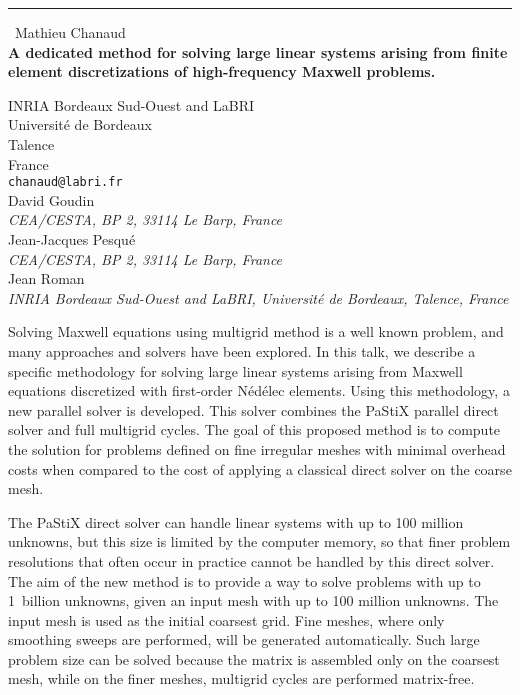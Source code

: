 \documentclass{report}
\begin{document}
\begin{center}
\rule{6in}{1pt} \
{\large Mathieu Chanaud \\
{\bf A dedicated method for solving large linear systems arising from finite element discretizations of high-frequency Maxwell problems. }}

INRIA Bordeaux Sud-Ouest and LaBRI \\ Universit\'e de Bordeaux \\ Talence \\ France
\\
{\tt chanaud@labri.fr}\\
David Goudin\\
{\em CEA/CESTA, BP 2, 33114 Le Barp, France}\\
Jean-Jacques Pesqu\'e\\
{\em CEA/CESTA, BP 2, 33114 Le Barp, France}\\
Jean Roman\\
{\em INRIA Bordeaux Sud-Ouest and LaBRI, Universit\'e de Bordeaux, Talence, France}\end{center}

\newcommand{\nedelec}{N\'ed\'elec}
Solving Maxwell equations using multigrid method is a well known
problem, and many approaches and solvers have been explored. In this
talk, we describe a specific
methodology for solving large linear systems arising from Maxwell
equations discretized with first-order {\nedelec} elements. Using this
methodology, a new parallel solver is developed. This solver combines
the PaStiX parallel direct solver and full multigrid cycles. The goal
of this proposed method is to compute the solution for problems
defined on fine irregular meshes with minimal overhead costs when
compared to the cost of applying a classical direct solver on the
coarse mesh.

The PaStiX direct solver can handle linear systems with up to 100 million
unknowns, but this size is
limited by the computer memory, so that finer problem resolutions that
often occur in practice cannot be handled by this direct solver. The
aim of the new method is to provide a way to solve problems with up to
1~billion unknowns, given an input mesh with up to 100 million
unknowns. The input mesh is used as the initial coarsest grid. Fine
meshes, where only smoothing sweeps are performed, will be generated
automatically. Such large problem size can be solved because the
matrix is assembled only on the coarsest mesh, while on the finer
meshes, multigrid cycles are performed matrix-free.
\end{document}
